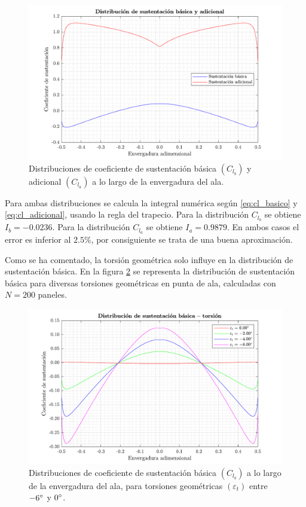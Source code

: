 \begin{figure}[ht]
    \centering
    \includegraphics[width=\linewidth]{imagenes/distribucion_lift/lift_distribution.pdf}
    \caption{Distribuciones de coeficiente de sustentación básica $\left( C_{l_b} \right)$ y adicional $\left( C_{l_a} \right)$ a lo largo de la envergadura del ala.}
    \label{fig:lift_distribution}
    \vspace{-4mm}
\end{figure}

Para ambas distribuciones se calcula la integral numérica según \eqref{eq:cl_basico} y \eqref{eq:cl_adicional}, usando la regla del trapecio. Para la distribución $C_{l_b}$ se obtiene $I_b = -0.0236$. Para la distribución $C_{l_a}$ se obtiene $I_a = 0.9879$. En ambos casos el error es inferior al $2.5\%$, por consiguiente se trata de una buena aproximación.  

Como se ha comentado, la torsión geométrica solo influye en la distribución de sustentación básica. En la figura \ref{fig:torsion_basic_lift} se representa la distribución de sustentación básica para diversas torsiones geométricas en punta de ala, calculadas con $N = 200$ paneles.

\begin{figure}[h]
    \centering
    \includegraphics[width=\linewidth]{imagenes/distribucion_lift/torsion_basic_lift.pdf}
    \caption{Distribuciones de coeficiente de sustentación básica $\left( C_{l_b} \right)$ a lo largo de la envergadura del ala, para torsiones geométricas $\left( \varepsilon_t \right)$ entre $-6\mathrm{^{\circ}}$ y $0 \mathrm{^{\circ}}$.}
    \label{fig:torsion_basic_lift}
    \vspace{-4mm}
\end{figure}

